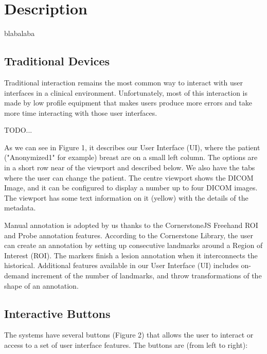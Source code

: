 \section{Description}

blabalaba

\subsection{Traditional Devices}

Traditional interaction remains the most common way to interact with user interfaces in a clinical environment. Unfortunately, most of this interaction is made by low profile equipment that makes users produce more errors and take more time interacting with those user interfaces.



TODO...

As we can see in Figure 1, it describes our User Interface (UI), where the patient ("Anonymized1" for example) breast are on a small left column. The options are in a short row near of the viewport and described below. We also have the tabs where the user can change the patient. The centre viewport shows the DICOM Image, and it can be configured to display a number up to four DICOM images. The viewport has some text information on it (yellow) with the details of the metadata.

Manual annotation is adopted by us thanks to the CornerstoneJS Freehand ROI and Probe annotation features. According to the Cornerstone Library, the user can create an annotation by setting up consecutive landmarks around a Region of Interest (ROI). The markers finish a lesion annotation when it interconnects the historical. Additional features available in our User Interface (UI) includes on-demand increment of the number of landmarks, and throw transformations of the shape of an annotation.

\subsection{Interactive Buttons}


The systems have several buttons (Figure 2) that allows the user to interact or access to a set of user interface features. The buttons are (from left to right):

